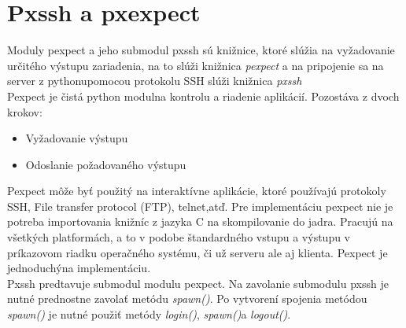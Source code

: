 \section{Pxssh a pxexpect}
Moduly pexpect\cite{pexpect} a jeho submodul pxssh\cite{pxssh} sú knižnice, ktoré slúžia na vyžadovanie určitého výstupu zariadenia, na to slúži knižnica \textit{pexpect} a na pripojenie sa na server z pythonupomocou protokolu SSH slúži knižnica \textit{pxssh}\\
Pexpect je čistá python modulna kontrolu a riadenie aplikácií. Pozostáva z dvoch krokov:\begin{itemize}
\item Vyžadovanie výstupu
\item Odoslanie požadovaného výstupu
\end{itemize} 
Pexpect môže byť použitý na interaktívne aplikácie, ktoré používajú protokoly SSH, File transfer protocol (FTP), telnet,atď. Pre implementáciu pexpect nie je potreba importovania knižníc z jazyka C na skompilovanie do jadra. Pracujú na všetkých platformách, a to v podobe štandardného vstupu a výstupu v príkazovom riadku operačného systému, či už serveru ale aj klienta. Pexpect je jednoduchýna implementáciu.\\
Pxssh predtavuje submodul modulu pexpect. Na zavolanie submodulu pxssh je nutné prednostne zavolať metódu \textit{spawn()}. Po vytvorení spojenia metódou \textit{spawn()} je nutné použiť metódy \textit{login()}, \textit{spawn()}a \textit{logout()}.
